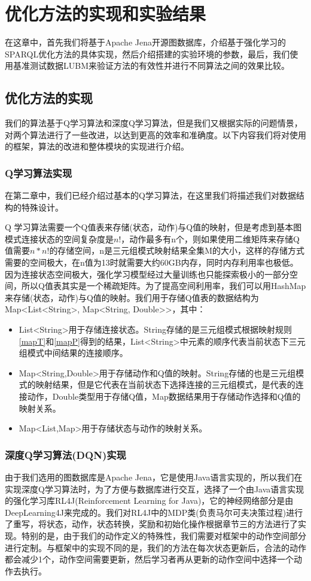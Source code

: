 \chapter{优化方法的实现和实验结果}
在这章中，首先我们将基于Apache Jena开源图数据库，介绍基于强化学习的SPARQL优化方法的具体实现，然后介绍搭建的实验环境的参数，最后，我们使用基准测试数据LUBM来验证方法的有效性并进行不同算法之间的效果比较。
\section{优化方法的实现}
我们的算法基于Q学习算法和深度Q学习算法，但是我们又根据实际的问题情景，对两个算法进行了一些改进，以达到更高的效率和准确度。以下内容我们将对使用的框架，算法的改进和整体模块的实现进行介绍。
\subsection{Q学习算法实现}
在第二章中，我们已经介绍过基本的Q学习算法，在这里我们将描述我们对数据结构的特殊设计。

Q 学习算法需要一个Q值表来存储(状态，动作)与Q值的映射，但是考虑到基本图模式连接状态的空间复杂度是$n!$，动作最多有n个，则如果使用二维矩阵来存储Q值需要$n*n!$的存储空间，n是三元组模式映射结果全集M的大小，这样的存储方式需要的空间极大，在n值为13时就需要大约60GB内存，同时内存利用率也极低。因为连接状态空间极大，强化学习模型经过大量训练也只能探索极小的一部分空间，所以Q值表其实是一个稀疏矩阵。为了提高空间利用率，我们可以用HashMap来存储(状态，动作)与Q值的映射。我们用于存储Q值表的数据结构为Map<List<String>, Map<String, Double>>，其中：
\begin{itemize}
    \item List<String>用于存储连接状态。String存储的是三元组模式根据映射规则\ref{mapT}和\ref{mapP}得到的结果，List<String>中元素的顺序代表当前状态下三元组模式中间结果的连接顺序。
    \item Map<String,Double>用于存储动作和Q值的映射。String存储的也是三元组模式的映射结果，但是它代表在当前状态下选择连接的三元组模式，是代表的连接动作，Double类型用于存储Q值，Map数据结果用于存储动作选择和Q值的映射关系。
    \item Map<List,Map>用于存储状态与动作的映射关系。
\end{itemize}

\subsection{深度Q学习算法(DQN)实现}
由于我们选用的图数据库是Apache Jena，它是使用Java语言实现的，所以我们在实现深度Q学习算法时，为了方便与数据库进行交互，选择了一个由Java语言实现的强化学习库RL4J(Reinforcement Learning for Java)，它的神经网络部分是由DeepLearning4J来完成的。我们对RL4J中的MDP类(负责马尔可夫决策过程)进行了重写，将状态，动作，状态转换，奖励和初始化操作根据章节三的方法进行了实现。特别的是，由于我们的动作定义的特殊性，我们需要对框架中的动作空间部分进行定制。与框架中的实现不同的是，我们的方法在每次状态更新后，合法的动作都会减少1个，动作空间需要更新，然后学习者再从更新的动作空间中选择一个动作去执行。


